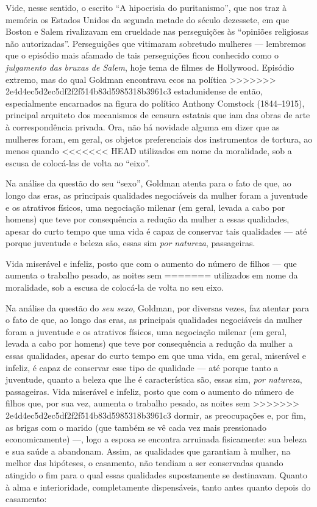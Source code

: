 Vide, nesse sentido, o escrito ``A
hipocrisia do puritanismo'', que nos traz à memória os Estados Unidos da
segunda metade do século dezessete, em que Boston e Salem rivalizavam em
crueldade nas perseguições às ``opiniões religiosas não autorizadas''. 
Perseguições que vitimaram sobretudo mulheres --- lembremos que o
episódio mais afamado de tais perseguições ficou conhecido como o
\textit{julgamento das bruxas de Salem}, hoje tema de filmes de Hollywood.
Episódio extremo, mas do qual Goldman encontrava ecos na política
>>>>>>> 2e4d4ec5d2ec5df2f2f514b83d5985318b3961c3
estadunidense de então, especialmente encarnados na figura do político
Anthony Comstock (1844--1915), principal arquiteto dos mecanismos de
censura estatais que iam das obras de arte à correspondência privada.
Ora, não há novidade alguma em dizer que as mulheres foram, em geral, os
objetos preferenciais dos instrumentos de tortura, ao menos quando
<<<<<<< HEAD
utilizados em nome da moralidade, sob a escusa de colocá-las de volta ao
``eixo''.

Na análise da questão do seu ``sexo'', Goldman
atenta para o fato de que, ao longo das eras, as principais qualidades
negociáveis da mulher foram a juventude e os atrativos físicos, uma
negociação milenar (em geral, levada a cabo por homens) que teve por
consequência a redução da mulher a essas qualidades, apesar do curto
tempo que uma vida é capaz de
conservar tais qualidades --- até porque juventude e beleza são, essas sim \emph{por natureza}, passageiras.

Vida miserável e infeliz, posto que com o aumento do número
de filhos --- que aumenta o trabalho pesado, as noites sem
=======
utilizados em nome da moralidade, sob a escusa de colocá-la de volta no
seu eixo.

Na análise da questão do \textit{seu sexo}, Goldman, por diversas vezes, faz
atentar para o fato de que, ao longo das eras, as principais qualidades
negociáveis da mulher foram a juventude e os atrativos físicos, uma
negociação milenar (em geral, levada a cabo por homens) que teve por
consequência a redução da mulher a essas qualidades, apesar do curto
tempo em que uma vida, em geral, miserável e infeliz, é capaz de
conservar esse tipo de qualidade --- até porque tanto a juventude, quanto
a beleza que lhe é característica são, essas sim, \textit{por natureza},
passageiras. Vida miserável e infeliz, posto que com o aumento do número
de filhos que, por sua vez, aumenta o trabalho pesado, as noites sem
>>>>>>> 2e4d4ec5d2ec5df2f2f514b83d5985318b3961c3
dormir, as preocupações e, por fim, as brigas com o marido (que também
se vê cada vez mais pressionado economicamente) ---, logo a
esposa se encontra arruinada fisicamente: sua beleza e sua saúde a
abandonam. Assim, as qualidades que garantiam à mulher, na
melhor das hipóteses, o casamento, não tendiam a ser conservadas quando
atingido o fim para o qual essas qualidades supostamente se destinavam.
Quanto à alma e interioridade, completamente dispensáveis,
tanto antes quanto depois do casamento:

